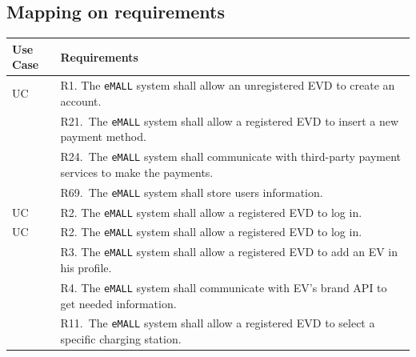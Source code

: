 \subsection{Mapping on requirements}
\label{subsec: map_on_req}%
\setcounter{mr}{1}
\newcommand{\cmr}{\themr\stepcounter{mr}}
\begin{center}
    \begin{longtable}{p{0.12\linewidth}p{0.88\linewidth}}
        \hline
        \textbf{Use Case} & \textbf{Requirements}                                                                                                                                  \\
        \hline
        UC\cmr            & R1. The \verb|eMALL| system shall allow an unregistered EVD to create an account.                                                                      \\
        & R21.\ The \verb|eMALL| system shall allow a registered EVD to insert a new payment method.                                                             \\
        & R24.\ The \verb|eMALL| system shall communicate with third-party payment services to make the payments.                                                \\
        & R69.\ The \verb|eMALL| system shall store users information.                                                                                           \\
        \hline
        UC\cmr            & R2. The \verb|eMALL| system shall allow a registered EVD to log in.                                                                                    \\
        \hline
        UC\cmr            & R2. The \verb|eMALL| system shall allow a registered EVD to log in.                                                                                    \\
        & R3. The \verb|eMALL| system shall allow a registered EVD to add an EV in his profile.                                                                  \\
        & R4. The \verb|eMALL| system shall communicate with EV’s brand API to get needed information.                                                           \\
        & R11.\ The \verb|eMALL| system shall allow a registered EVD to select a specific charging station.                                                      \\

\end{longtable}
\end{center}
